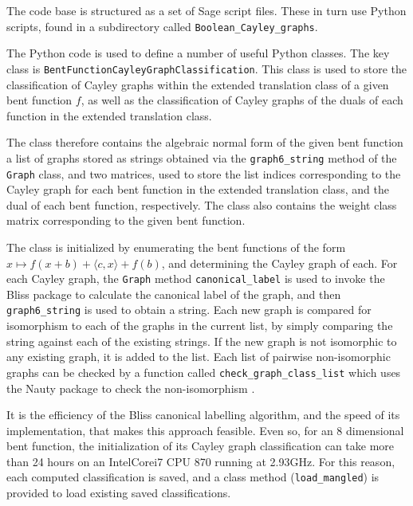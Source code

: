 \documentclass[12pt,a4paper]{article}
\begin{document}
The code base is structured as a set of Sage script files. %
These in turn use Python scripts, found in a subdirectory called \texttt{Boolean\_Cayley\_graphs}.

The Python code is used to define a number of useful Python classes.
The key class is \texttt{BentFunctionCayleyGraphClassification}.
This class is used to store the classification of Cayley graphs within the extended translation
class of a given bent function $f$, as well as the classification of Cayley graphs of the duals of
each function in the extended translation class.

The class therefore contains the algebraic normal form of the given bent function
a list of graphs
stored as strings obtained via the \texttt{graph6\_string} \cite{McKP13nauty}
method of the \texttt{Graph} class, and two matrices,
used to store the list indices corresponding to
the Cayley graph for each bent function in the extended translation class, and the dual of each bent
function, respectively.
The class also contains the weight class matrix
corresponding to the given bent function.

The class is initialized by enumerating the bent functions of the form
$x \mapsto f(x+b) + \langle c, x \rangle + f(b)$,
and determining the Cayley graph of each.
For each Cayley graph, the \texttt{Graph} method \texttt{canonical\_label} is used
to invoke the Bliss package \cite{JunK07Bliss,JunK11conflict} to calculate the canonical label
of the graph, and then \texttt{graph6\_string} is used to obtain a string.
Each new graph is compared for isomorphism to each of the graphs in the current list,
by simply comparing the string against each of the existing strings.
If the new graph is not isomorphic to any existing graph, it is added to the list.
Each list of pairwise non-isomorphic graphs can be checked by a function called \texttt{check\_graph\_class\_list}
which uses the Nauty package to check the non-isomorphism \cite{McKP13nauty,McKP14practical}.

It is the efficiency of the Bliss canonical labelling algorithm, and the speed of its implementation, that makes this approach feasible.
Even so, for an 8 dimensional bent function, the initialization of its Cayley graph classification
can take more than 24 hours on an Intel\textregistered Core\texttrademark i7 CPU 870 running at 2.93GHz.
For this reason, each computed classification is saved, and a class method (\texttt{load\_mangled})
is provided to load existing saved classifications.
\end{document}
